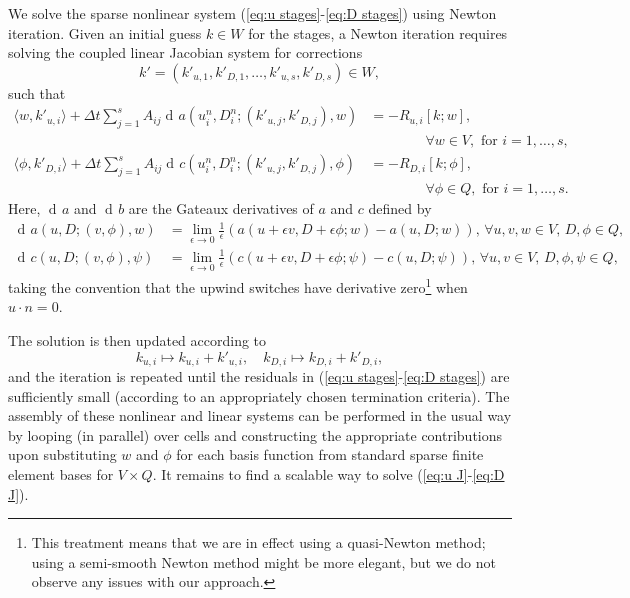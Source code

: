 \documentclass[a4paper, 12pt]{article}
\DeclareMathOperator{\diff}{d}
\DeclareMathOperator{\gat}{\diff\!}
\begin{document}
We solve the sparse nonlinear system (\ref{eq:u stages}-\ref{eq:D
  stages}) using Newton iteration. Given an initial guess $k\in W$ for
the stages, a Newton iteration requires solving the coupled linear
Jacobian system for corrections
\[
k' = (k'_{u,1},k'_{D,1},\ldots, k'_{u,s},k'_{D,s}) \in W,
\]
such that
\begin{align}
  \nonumber
    \langle w, k'_{u,i} \rangle +
   \Delta t \sum_{j=1}^sA_{ij}\gat a\left(u^n_i,D^n_i;(k'_{u,j}, k'_{D,j}),
   w\right) &=  -R_{u,i}[k;w], \\
   \label{eq:u J}
   & \qquad\qquad    \forall w \in V,\mbox{ for }i=1,\ldots,s, \\
   \nonumber
  \langle \phi, k'_{D,i} \rangle
  + \Delta t\sum_{j=1}^sA_{ij}\gat c\left(u^n_i,D^n_i;(k'_{u,j}, k'_{D,j}),
  \phi\right)  &= -R_{D,i}[k;\phi], \\
  & \qquad \qquad \forall \phi \in Q,\mbox{ for }i=1,\ldots,s.
    \label{eq:D J}
\end{align}
Here, $\gat a$ and $\gat b$ are the Gateaux
derivatives of $a$ and $c$ defined by
\begin{align}
  \gat a(u,D;(v,\phi),w) & = \lim_{\epsilon\to 0}
  \frac{1}{\epsilon}(a(u+\epsilon v,D+\epsilon \phi; w)
  - a(u,D;w)),  \, \forall u,v,w \in V, \, D,\phi \in Q, \\
  \gat c(u,D;(v,\phi),\psi) & = \lim_{\epsilon\to 0}
  \frac{1}{\epsilon}(c(u+\epsilon v,D+\epsilon \phi; \psi)
  - c(u,D;\psi)), \, \forall u,v \in V,\, D,\phi,\psi \in Q,
\end{align}
taking the convention that the upwind switches have derivative
zero\footnote{This treatment means that we are in effect using a
quasi-Newton method; using a semi-smooth Newton method might be
more elegant, but we do not observe any issues with our approach.}
when $u\cdot n=0$.

The solution is then updated according to
\begin{equation}
  k_{u,i}\mapsto k_{u,i} + k'_{u,i}, \quad
  k_{D,i}\mapsto k_{D,i} + k'_{D,i},
\end{equation}
and the iteration is repeated until the residuals in (\ref{eq:u
  stages}-\ref{eq:D stages}) are sufficiently small (according to an
appropriately chosen termination criteria).  The assembly of these
nonlinear and linear systems can be performed in the usual way by
looping (in parallel) over cells and constructing the appropriate
contributions upon substituting $w$ and $\phi$ for each basis function
from standard sparse finite element bases for $V\times Q$. It remains
to find a scalable way to solve (\ref{eq:u J}-\ref{eq:D J}).
\end{document}
